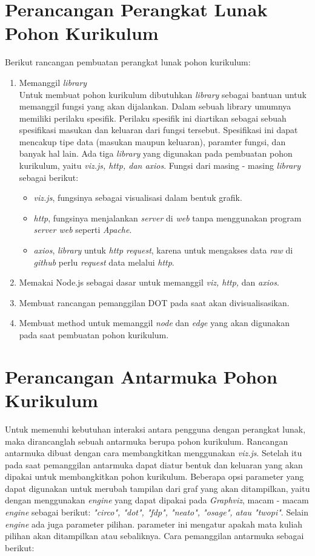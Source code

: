 \section{Perancangan Perangkat Lunak Pohon Kurikulum}
\label{sec: Perancangan Perangkat Lunak Pohon Kurikulum}
Berikut rancangan pembuatan perangkat lunak pohon kurikulum:

\begin{enumerate}
\item Memanggil \textit{library}\\
Untuk membuat pohon kurikulum dibutuhkan \textit{library} sebagai bantuan untuk memanggil fungsi yang akan dijalankan. Dalam sebuah library umumnya memiliki perilaku spesifik. Perilaku spesifik ini diartikan sebagai sebuah spesifikasi masukan dan keluaran dari fungsi tersebut. Spesifikasi ini dapat mencakup tipe data (masukan maupun keluaran), paramter fungsi, dan banyak hal lain. Ada tiga \textit{library} yang digunakan pada pembuatan pohon kurikulum, yaitu \textit{viz.js, http, dan axios}. Fungsi dari masing - masing \textit{library} sebagai berikut:
\begin{itemize}
\item \textit{viz.js}, fungsinya sebagai visualisasi dalam bentuk grafik.
\item \textit{http}, fungsinya menjalankan \textit{server} di \textit{web} tanpa menggunakan program \textit{server web} seperti \textit{Apache}. 
\item \textit{axios}, \textit{library} untuk \textit{http request}, karena untuk mengakses data \textit{raw} di \textit{github} perlu \textit{request} data melalui \textit{http}.
\end{itemize} 
\item Memakai Node.js sebagai dasar untuk memanggil \textit{viz, http,} dan \textit{axios}.
\item Membuat rancangan pemanggilan DOT pada saat akan divisualisasikan. 
\item Membuat method untuk memanggil \textit{node} dan \textit{edge} yang akan digunakan pada saat pembuatan pohon kurikulum.
\end{enumerate}


\section{Perancangan Antarmuka Pohon Kurikulum}
\label{sec: Perancangan Antarmuka Pohon Kurikulum}
Untuk memenuhi kebutuhan interaksi antara pengguna dengan perangkat lunak, maka dirancanglah sebuah antarmuka berupa pohon kurikulum. Rancangan antarmuka dibuat dengan cara membangkitkan menggunakan \textit{viz.js}. Setelah itu pada saat pemanggilan antarmuka dapat diatur bentuk dan keluaran yang akan dipakai untuk membangkitkan pohon kurikulum. Beberapa opsi parameter yang dapat digunakan untuk merubah tampilan dari graf yang akan ditampilkan, yaitu dengan menggunakan \textit{engine} yang dapat dipakai pada \textit{Graphviz}, macam - macam \textit{engine} sebagai berikut: \textit{"circo", "dot", "fdp", "neato", "osage", atau "twopi"}. Selain \textit{engine} ada juga parameter pilihan. parameter ini mengatur apakah mata kuliah pilihan akan ditampilkan atau sebaliknya. Cara pemanggilan antarmuka sebagai berikut:


